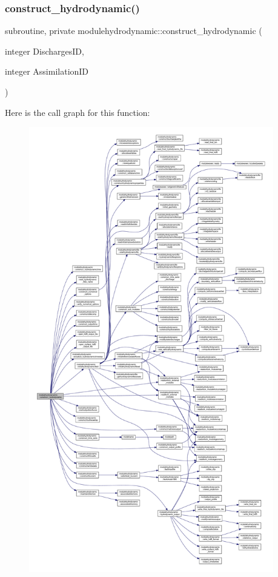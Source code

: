 \subsubsection{\texorpdfstring{construct\+\_\+hydrodynamic()}{construct\_hydrodynamic()}}
{\footnotesize\ttfamily subroutine, private modulehydrodynamic\+::construct\+\_\+hydrodynamic (\begin{DoxyParamCaption}\item[{integer}]{Discharges\+ID,  }\item[{integer}]{Assimilation\+ID }\end{DoxyParamCaption})\hspace{0.3cm}{\ttfamily [private]}}

Here is the call graph for this function\+:\nopagebreak
\begin{figure}[H]
\begin{center}
\leavevmode
\includegraphics[height=550pt]{namespacemodulehydrodynamic_a71f29b5c93f202c8e783ecb892b1b497_cgraph}
\end{center}
\end{figure}
